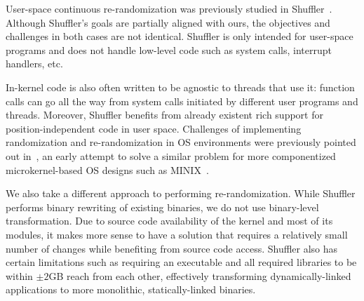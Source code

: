 User-space continuous re\hyp{}randomization was previously studied in Shuffler~\cite{SHUFFLER}. Although Shuffler's goals are partially aligned with ours, the objectives and challenges in both cases are not identical. Shuffler is only intended for user-space programs and does not
handle low-level code such as system calls, interrupt handlers, etc.


In-kernel code is also often written to be agnostic to threads that use it: function calls can go all the way from system calls initiated by different user programs and threads. Moreover, Shuffler benefits
from already existent rich support for position-independent code in user space. Challenges of implementing randomization and re\hyp{}randomization in OS environments were previously pointed out in~\cite{ASRMINIX}, an early attempt to solve a similar problem for more componentized microkernel-based
OS designs such as MINIX~\cite{MINIX}.

We also take a different approach to performing re\hyp{}randomization. While
Shuffler performs binary rewriting of existing binaries, we
do not use binary-level transformation. Due to source code availability
of the kernel and most of its modules, it makes more sense to
have a solution that requires a relatively small number of changes while
benefiting from source code access. Shuffler also has certain
limitations such as requiring an executable and all required libraries
to be within $\pm 2$GB reach from each other, effectively transforming
dynamically-linked applications to more monolithic, statically-linked binaries.